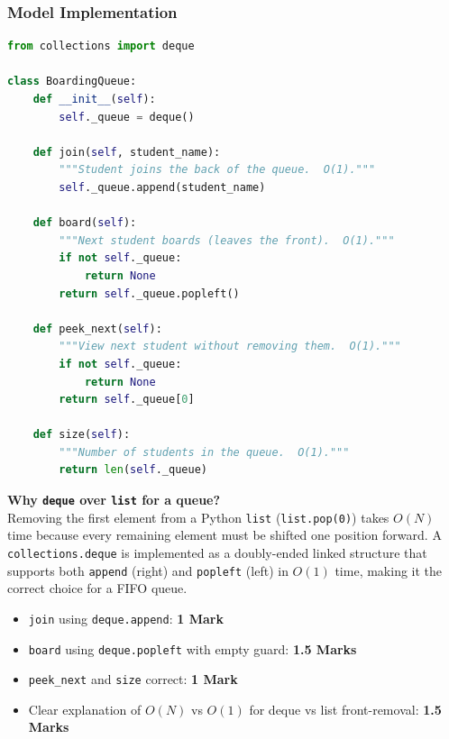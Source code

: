\documentclass[11pt,a4paper]{article}
\newenvironment{markbox}[1]{%
    \begin{tcolorbox}[colback=markgreen!6!white, colframe=markgreen, title=\textbf{Mark Allocation --- #1}]
}{%
    \end{tcolorbox}
}
\begin{document}
\subsubsection*{Model Implementation}
\begin{lstlisting}[language=Python]
from collections import deque

class BoardingQueue:
    def __init__(self):
        self._queue = deque()

    def join(self, student_name):
        """Student joins the back of the queue.  O(1)."""
        self._queue.append(student_name)

    def board(self):
        """Next student boards (leaves the front).  O(1)."""
        if not self._queue:
            return None
        return self._queue.popleft()

    def peek_next(self):
        """View next student without removing them.  O(1)."""
        if not self._queue:
            return None
        return self._queue[0]

    def size(self):
        """Number of students in the queue.  O(1)."""
        return len(self._queue)
\end{lstlisting}

\textbf{Why \texttt{deque} over \texttt{list} for a queue?} \\
Removing the first element from a Python \texttt{list} (\texttt{list.pop(0)}) takes $O(N)$ time because every remaining element must be shifted one position forward. A \texttt{collections.deque} is implemented as a doubly-ended linked structure that supports both \texttt{append} (right) and \texttt{popleft} (left) in $O(1)$ time, making it the correct choice for a FIFO queue.

\begin{markbox}{C6 --- 5 Marks}
\begin{itemize}
    \item \texttt{join} using \texttt{deque.append}: \textbf{1 Mark}
    \item \texttt{board} using \texttt{deque.popleft} with empty guard: \textbf{1.5 Marks}
    \item \texttt{peek\_next} and \texttt{size} correct: \textbf{1 Mark}
    \item Clear explanation of $O(N)$ vs $O(1)$ for deque vs list front-removal: \textbf{1.5 Marks}
\end{itemize}
\end{markbox}

\newpage
\end{document}
